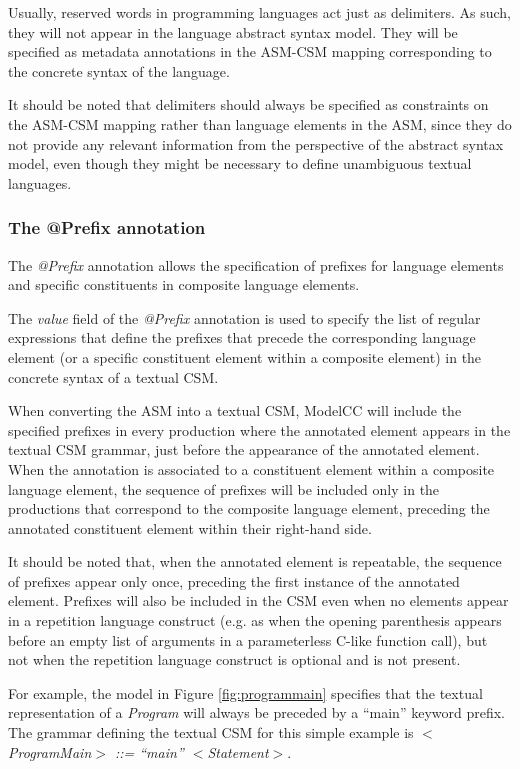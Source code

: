 \documentclass[a4paper,twoside,onecolumn]{article}
\newcommand{\etexttt}[1]{\textit{#1}}
\newcommand{\an}[1]{\emph{#1}} %
\begin{document}
Usually, reserved words in programming languages act just as delimiters.
As such, they will not appear in the language abstract syntax model.
They will be specified as metadata annotations in the ASM-CSM mapping corresponding to the concrete syntax of the language.

It should be noted that delimiters should always be specified as constraints on the ASM-CSM mapping rather than language elements in the ASM, since they do not provide any relevant information from the perspective of the abstract syntax model, even though they might be necessary to define unambiguous textual languages.

\subsubsection{The @Prefix annotation}

The \an{@Prefix} annotation allows the specification of prefixes for language elements and specific constituents in composite language elements.

The \emph{value} field of the \an{@Prefix} annotation is used to specify the list of regular expressions that define the prefixes that precede the corresponding language element (or a specific constituent element within a composite element) in the concrete syntax of a textual CSM.

When converting the ASM into a textual CSM, ModelCC will include the specified prefixes in every production where the annotated element appears in the textual CSM grammar, just before the appearance of the annotated element.
When the annotation is associated to a constituent element within a composite language element, the sequence of prefixes will be included only in the productions that correspond to the composite language element, preceding the annotated constituent element within their right-hand side.

It should be noted that, when the annotated element is repeatable, the sequence of prefixes appear only once, preceding the first instance of the annotated element.
Prefixes will also be included in the CSM even when no elements appear in a repetition language construct (e.g. as when the opening parenthesis appears before an empty list of arguments in a parameterless C-like function call), but not when the repetition language construct is optional and is not present.

For example, the model in Figure \ref{fig:programmain} specifies that the textual representation of a \emph{Program} will always be preceded by a ``main'' keyword prefix.
The grammar defining the textual CSM for this simple example is  \etexttt{$<$ProgramMain$>$ ::= ``main'' $<$Statement$>$}.
\end{document}

